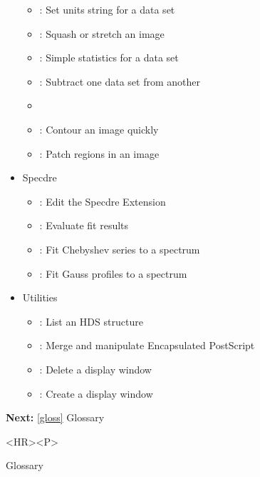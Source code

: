 \begin{itemize}
\begin{itemize}
   \item {}: Set units string for a data set
   \item {}: Squash or stretch an image
   \item {}: Simple statistics for a data set
   \item {}: Subtract one data set from another
   \item {}
   \item {}: Contour an image quickly
   \item {}: Patch regions in an image
   \end{itemize}
\item Specdre 
   \begin{itemize}
   \item {}: Edit the Specdre Extension
   \item {}: Evaluate fit results
   \item {}: Fit Chebyshev series to a spectrum
   \item {}: Fit Gauss profiles to a spectrum
   \end{itemize}
\item Utilities
   \begin{itemize}
   \item {}: List an HDS structure
   \item {}: Merge and manipulate Encapsulated PostScript
   \item {}: Delete a display window
   \item {}: Create a display window
   \end{itemize}
\end{itemize}

\begin{latexonly}
{\bf Next:} \ref{gloss} Glossary\\
\end{latexonly}

\begin{htmlonly}
\begin{rawhtml} <HR><P> \end{rawhtml}
{\bf {}} Glossary\\
{\bf {}}\\
{\bf {}}\\
\end{htmlonly}


